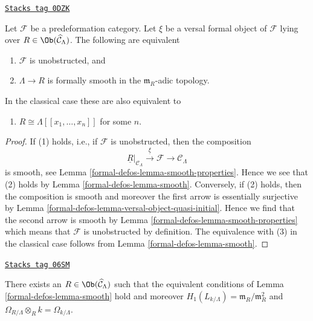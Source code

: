 \begin{lemma}
\label{formal-defos-lemma-smooth-power-series-classical}
\href{https://stacks.math.columbia.edu/tag/0DZK}{\texttt{Stacks tag 0DZK}}

Let $\mathcal{F}$ be a predeformation category.
Let $\xi$ be a versal formal object of $\mathcal{F}$ lying over
$R \in \Ob(\widehat{\mathcal{C}}_\Lambda)$. The following are
equivalent
\begin{enumerate}
\item $\mathcal{F}$ is unobstructed, and
\item $\Lambda \to R$ is formally smooth in the $\mathfrak m_R$-adic topology.
\end{enumerate}
In the classical case these are also equivalent to
\begin{enumerate}
\item[(3)] $R \cong \Lambda[[x_1, \ldots, x_n]]$ for some $n$.\
\end{enumerate}
\end{lemma}

\begin{proof}
If (1) holds, i.e., if $\mathcal{F}$ is unobstructed, then the composition
$$
\underline{R}|_{\mathcal{C}_\Lambda}
\xrightarrow{\underline{\xi}}
\mathcal{F}
\to
\mathcal{C}_\Lambda
$$
is smooth, see Lemma \ref{formal-defos-lemma-smooth-properties}.
Hence we see that (2) holds by Lemma \ref{formal-defos-lemma-smooth}.
Conversely, if (2) holds, then the composition is smooth
and moreover the first arrow is essentially surjective by
Lemma \ref{formal-defos-lemma-versal-object-quasi-initial}. Hence we
find that the second arrow is smooth by Lemma \ref{formal-defos-lemma-smooth-properties}
which means that $\mathcal{F}$ is unobstructed by definition.
The equivalence with (3) in the classical case follows
from Lemma \ref{formal-defos-lemma-smooth}.
\end{proof}

\begin{lemma}
\label{formal-defos-lemma-exists-smooth}
\href{https://stacks.math.columbia.edu/tag/06SM}{\texttt{Stacks tag 06SM}}
\group{formal-defos}

There exists an $R \in \Ob(\widehat{\mathcal{C}}_\Lambda)$
such that the equivalent conditions of Lemma \ref{formal-defos-lemma-smooth}
hold and moreover $H_1(L_{k/\Lambda}) = \mathfrak m_R/\mathfrak m_R^2$
and $\Omega_{R/\Lambda} \otimes_R k = \Omega_{k/\Lambda}$.
\end{lemma}

